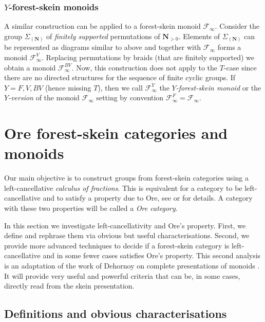 \documentclass[a4paper, 12pt]{amsart}
\numberwithin{equation}{section}
\theoremstyle{definition}
\newcommand{\cF}{\mathcal F}
\newcommand{\N}{\mathbf{N}}
\begin{document}
\subsubsection{$Y$-forest-skein monoids}

A similar construction can be applied to a forest-skein monoid $\cF_\infty$.
Consider the group $\Sigma_{(\N)}$ of {\it finitely supported} permutations of $\N_{>0}.$
Elements of $\Sigma_{(\N)}$ can be represented as diagrams similar to above and together with $\cF_\infty$ forms a monoid $\cF_\infty^V$.
Replacing permutations by braids (that are finitely supported) we obtain a monoid $\cF_\infty^{BV}$.
Now, this construction does not apply to the $T$-case since there are no directed structures for the sequence of finite cyclic groups. 
If $Y=F,V,BV$ (hence missing $T$), then we call $\cF_\infty^Y$ the {\it $Y$-forest-skein monoid} or the {\it $Y$-version} of the monoid $\cF_\infty$ setting by convention $\cF_\infty^F=\cF_\infty$.

\section{Ore forest-skein categories and monoids}\label{sec:Dehornoy}
Our main objective is to construct groups from forest-skein categories using a left-cancellative {\it calculus of fractions}. 
This is equivalent for a category to be left-cancellative and to satisfy a property due to Ore, see \cite[Chapter I]{Gabriel-Zisman67} or \cite[Chapter 3]{Dehornoy-book} for details.
A category with these two properties will be called a \textit{Ore category}. 

In this section we investigate left-cancellativity and Ore's property.
First, we define and rephrase them via obvious but useful characterisations. 
Second, we provide more advanced techniques to decide if a forest-skein category is left-cancellative and in some fewer cases satisfies Ore's property. 
This second analysis is an adaptation of the work of Dehornoy on complete presentations of monoids \cite{Dehornoy03}.
It will provide very useful and powerful criteria that can be, in some cases, directly read from the skein presentation.

\subsection{Definitions and obvious characterisations}
\end{document}

